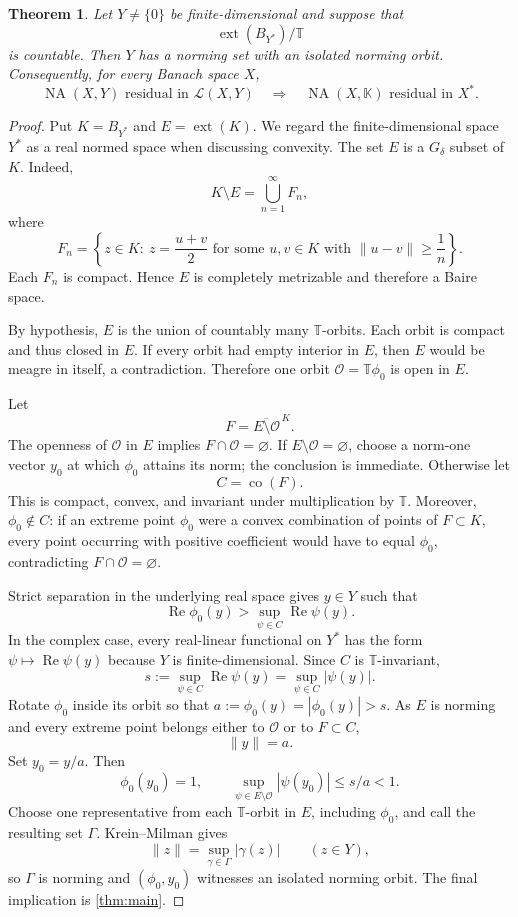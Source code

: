 \documentclass[11pt]{article}
\newtheorem{theorem}{Theorem}[section]
\theoremstyle{definition}
\theoremstyle{remark}
\newcommand{\K}{\mathbb K}
\newcommand{\T}{\mathbb T}
\newcommand{\NA}{\operatorname{NA}}
\newcommand{\calL}{\mathcal L}
\newcommand{\ext}{\operatorname{ext}}
\newcommand{\co}{\operatorname{co}}
\newcommand{\norm}[1]{\lVert #1\rVert}
\begin{document}
\begin{theorem}\label{thm:countableorbits}
Let $Y\ne\{0\}$ be finite-dimensional and suppose that
\[
 \ext(B_{Y^*})/\T
\]
is countable.  Then $Y$ has a norming set with an isolated norming orbit.  Consequently, for every Banach space $X$,
\[
 \NA(X,Y)\text{ residual in }\calL(X,Y)
 \quad\Longrightarrow\quad
 \NA(X,\K)\text{ residual in }X^*.
\]
\end{theorem}

\begin{proof}
Put $K=B_{Y^*}$ and $E=\ext(K)$.  We regard the finite-dimensional space $Y^*$ as a real normed space when discussing convexity.  The set $E$ is a $G_\delta$ subset of $K$.  Indeed,
\[
 K\setminus E=\bigcup_{n=1}^{\infty}F_n,
\]
where
\[
 F_n=\left\{z\in K:\ z=\frac{u+v}{2}
       \text{ for some }u,v\in K\text{ with }\norm{u-v}\ge\frac1n\right\}.
\]
Each $F_n$ is compact.  Hence $E$ is completely metrizable and therefore a Baire space.

By hypothesis, $E$ is the union of countably many $\T$-orbits.  Each orbit is compact and thus closed in $E$.  If every orbit had empty interior in $E$, then $E$ would be meagre in itself, a contradiction.  Therefore one orbit
$\mathcal O=\T\phi_0$ is open in $E$.

Let
\[
 F=\overline{E\setminus\mathcal O}^{\,K}.
\]
The openness of $\mathcal O$ in $E$ implies $F\cap\mathcal O=\varnothing$.  If $E\setminus\mathcal O=\varnothing$, choose a norm-one vector $y_0$ at which $\phi_0$ attains its norm; the conclusion is immediate.  Otherwise let
\[
 C=\co(F).
\]
This is compact, convex, and invariant under multiplication by $\T$.  Moreover,
$\phi_0\notin C$: if an extreme point $\phi_0$ were a convex combination of points of $F\subset K$, every point occurring with positive coefficient would have to equal $\phi_0$, contradicting $F\cap\mathcal O=\varnothing$.

Strict separation in the underlying real space gives $y\in Y$ such that
\[
 \operatorname{Re}\phi_0(y)>
 \sup_{\psi\in C}\operatorname{Re}\psi(y).
\]
In the complex case, every real-linear functional on $Y^*$ has the form
$\psi\mapsto\operatorname{Re}\psi(y)$ because $Y$ is finite-dimensional.  Since $C$ is $\T$-invariant,
\[
 s:=\sup_{\psi\in C}\operatorname{Re}\psi(y)
   =\sup_{\psi\in C}|\psi(y)|.
\]
Rotate $\phi_0$ inside its orbit so that
$a:=\phi_0(y)=|\phi_0(y)|>s$.  As $E$ is norming and every extreme point belongs either to $\mathcal O$ or to $F\subset C$,
\[
 \norm y=a.
\]
Set $y_0=y/a$.  Then
\[
 \phi_0(y_0)=1,
 \qquad
 \sup_{\psi\in E\setminus\mathcal O}|\psi(y_0)|\le s/a<1.
\]
Choose one representative from each $\T$-orbit in $E$, including $\phi_0$, and call the resulting set $\Gamma$.  Krein--Milman gives
\[
 \norm z=\sup_{\gamma\in\Gamma}|\gamma(z)|
 \qquad(z\in Y),
\]
so $\Gamma$ is norming and $(\phi_0,y_0)$ witnesses an isolated norming orbit.  The final implication is \cref{thm:main}.
\end{proof}
\end{document}
